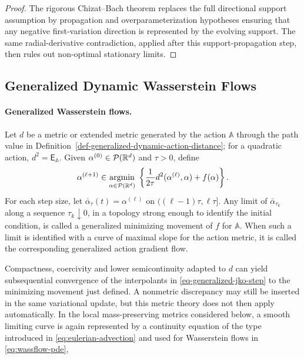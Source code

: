 \begin{proof}
The rigorous Chizat--Bach theorem replaces the full directional support assumption by propagation and overparameterization hypotheses ensuring that any negative first-variation direction is represented by the evolving support. The same radial-derivative contradiction, applied after this support-propagation step, then rules out non-optimal stationary limits.
\end{proof}
\subsection{Generalized Dynamic Wasserstein Flows}
\label{sec-generalized-dynamic-wasserstein-flows}
\paragraph{Generalized Wasserstein flows.}
\begin{defn}\label{def-generalized-action-gradient-flow}
Let $d$ be a metric or extended metric generated by the action $\mathbb A$ through the path value in Definition~\ref{def-generalized-dynamic-action-distance}; for a quadratic action, $d^2=\mathsf E_{\mathbb A}$. Given \(\alpha^{(0)}\in\mathcal{P}(\mathbb{R}^d)\) and \(\tau>0\), define
\begin{equation}\label{eq-generalized-jko-step}
\alpha^{(\ell+1)}
\in
\underset{\alpha\in\mathcal{P}(\mathbb{R}^d)}{\operatorname{argmin}}\;
\left\{\frac{1}{2\tau}d^2(\alpha^{(\ell)},\alpha)+f(\alpha)\right\}.
\end{equation}
For each step size, let \(\bar\alpha_\tau(t)=\alpha^{(\ell)}\) on \(((\ell-1)\tau,\ell\tau]\). Any limit of \(\bar\alpha_{\tau_k}\) along a sequence \(\tau_k\downarrow0\), in a topology strong enough to identify the initial condition, is called a generalized minimizing movement of \(f\) for \(\mathbb A\). When such a limit is identified with a curve of maximal slope for the action metric, it is called the corresponding generalized action gradient flow.
\end{defn}
Compactness, coercivity and lower semicontinuity adapted to \(d\) can yield subsequential convergence of the interpolants in \eqref{eq-generalized-jko-step} to the minimizing movement just defined. A nonmetric discrepancy may still be inserted in the same variational update, but this metric theory does not then apply automatically. In the local mass-preserving metrics considered below, a smooth limiting curve is again represented by a continuity equation of the type introduced in \eqref{eq:eulerian-advection} and used for Wasserstein flows in \eqref{eq:wassflow-pde},
